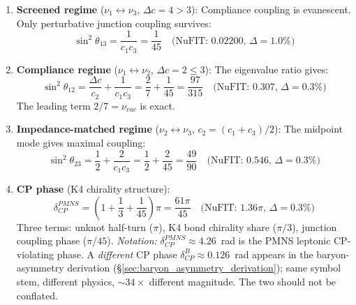 \begin{enumerate}
    \item \textbf{Screened regime} ($\nu_1 \leftrightarrow \nu_3$,
    $\Delta c = 4 > 3$): Compliance coupling is evanescent.  Only
    perturbative junction coupling survives:
    \begin{equation}
        \sin^2\theta_{13} = \frac{1}{c_1 c_3} = \frac{1}{45}
        \quad\text{(NuFIT: 0.02200, }\Delta = 1.0\%\text{)}
    \end{equation}

    \item \textbf{Compliance regime} ($\nu_1 \leftrightarrow \nu_2$,
    $\Delta c = 2 \le 3$): The eigenvalue ratio gives:
    \begin{equation}
        \sin^2\theta_{12} = \frac{\Delta c}{c_2} + \frac{1}{c_1 c_3}
        = \frac{2}{7} + \frac{1}{45} = \frac{97}{315}
        \quad\text{(NuFIT: 0.307, }\Delta = 0.3\%\text{)}
    \end{equation}
    The leading term $2/7 = \nu_{vac}$ is exact.

    \item \textbf{Impedance-matched regime} ($\nu_2 \leftrightarrow \nu_3$,
    $c_2 = (c_1+c_3)/2$): The midpoint mode gives maximal coupling:
    \begin{equation}
        \sin^2\theta_{23} = \frac{1}{2} + \frac{2}{c_1 c_3}
        = \frac{1}{2} + \frac{2}{45} = \frac{49}{90}
        \quad\text{(NuFIT: 0.546, }\Delta = 0.3\%\text{)}
    \end{equation}

    \item \textbf{CP phase} (K4 chirality structure):
    \begin{equation}
        \delta_{CP}^{PMNS} = \left(1 + \frac{1}{3} + \frac{1}{45}\right)\pi
        = \frac{61\pi}{45}
        \quad\text{(NuFIT: 1.36}\pi\text{, }\Delta = 0.3\%\text{)}
    \end{equation}
    Three terms: unknot half-turn ($\pi$), K4 bond chirality share ($\pi/3$),
    junction coupling phase ($\pi/45$). \textit{Notation:} $\delta_{CP}^{PMNS} \approx 4.26$~rad is the PMNS leptonic CP-violating phase. A \emph{different} CP phase $\delta_{CP}^{B} \approx 0.126$~rad appears in the baryon-asymmetry derivation (\S\ref{sec:baryon_asymmetry_derivation}); same symbol stem, different physics, $\sim\!34\times$ different magnitude. The two should not be conflated.
\end{enumerate}


